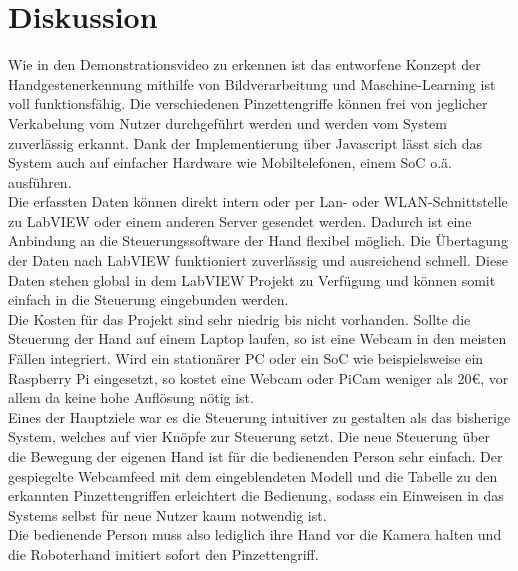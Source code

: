 \documentclass[a4paper,12pt,final]{article} %
\numberwithin{equation}{section} %
\numberwithin{figure}{section} %
\numberwithin{table}{section} %
\begin{document}
\section{Diskussion}
Wie in den Demonstrationsvideo zu erkennen ist das entworfene Konzept der Hand\-ge\-sten\-er\-ken\-nung mithilfe von Bildverarbeitung und Maschine-Learning ist voll funk\-tions\-fähig.
Die verschiedenen Pinzetten\-griffe können frei von jeglicher Verkabelung vom Nutzer durchgeführt werden und werden vom System zuverlässig erkannt.
Dank der Implementierung über Javascript lässt sich das System auch auf einfacher Hardware wie Mobiltelefonen, einem SoC o.ä. ausführen.\\
Die erfassten Daten können direkt intern oder per Lan- oder WLAN-Schnittstelle zu LabVIEW  oder einem anderen Server gesendet werden. Dadurch ist eine Anbindung an die Steuerungssoftware der Hand flexibel möglich.
Die Übertagung der Daten nach LabVIEW funktioniert zuverlässig und ausreichend schnell.
Diese Daten stehen global in dem LabVIEW Projekt zu Verfügung und können somit einfach in die Steuerung eingebunden werden.\\
Die Kosten für das Projekt sind sehr niedrig bis nicht vorhanden. Sollte die Steuerung der Hand auf einem Laptop laufen, so ist eine Webcam in den meisten Fällen integriert.
Wird ein stationärer PC oder ein SoC wie beispielsweise ein Raspberry Pi eingesetzt, so kostet eine Webcam oder PiCam weniger als 20€, vor allem da keine hohe Auflösung nötig ist.\\
Eines der Hauptziele war es die Steuerung intuitiver zu gestalten als das bisherige System, welches auf vier Knöpfe zur Steuerung setzt. Die neue Steuerung über die Bewegung der eigenen Hand ist für die bedienenden Person sehr einfach.
Der gespiegelte Webcamfeed mit dem eingeblendeten Modell und die Tabelle zu den erkannten Pinzettengriffen er\-leich\-tert die Bedienung, sodass ein Einweisen in das Systems selbst für neue Nutzer kaum notwendig ist.\\
Die bedienende Person muss also lediglich ihre Hand vor die Kamera halten und die Roboterhand imitiert sofort den Pinzettengriff. 
\newpage
\end{document}
